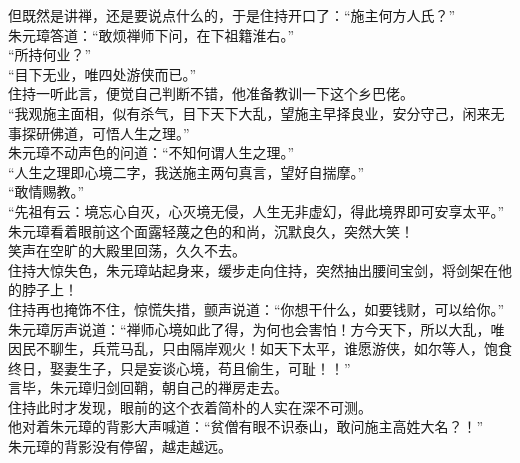 \begin{multicols}{\theparacolNo}
但既然是讲禅，还是要说点什么的，于是住持开口了：“施主何方人氏？”\\

朱元璋答道：“敢烦禅师下问，在下祖籍淮右。”\\

“所持何业？”\\

“目下无业，唯四处游侠而已。”\\

住持一听此言，便觉自己判断不错，他准备教训一下这个乡巴佬。\\

“我观施主面相，似有杀气，目下天下大乱，望施主早择良业，安分守己，闲来无事探研佛道，可悟人生之理。”\\

朱元璋不动声色的问道：“不知何谓人生之理。”\\

“人生之理即心境二字，我送施主两句真言，望好自揣摩。”\\

“敢情赐教。”\\

“先祖有云：境忘心自灭，心灭境无侵，人生无非虚幻，得此境界即可安享太平。”\\

朱元璋看着眼前这个面露轻蔑之色的和尚，沉默良久，突然大笑！\\

笑声在空旷的大殿里回荡，久久不去。\\

住持大惊失色，朱元璋站起身来，缓步走向住持，突然抽出腰间宝剑，将剑架在他的脖子上！\\

住持再也掩饰不住，惊慌失措，颤声说道：“你想干什么，如要钱财，可以给你。”\\

朱元璋厉声说道：“禅师心境如此了得，为何也会害怕！方今天下，所以大乱，唯因民不聊生，兵荒马乱，只由隔岸观火！如天下太平，谁愿游侠，如尔等人，饱食终日，娶妻生子，只是妄谈心境，苟且偷生，可耻！！”\\

言毕，朱元璋归剑回鞘，朝自己的禅房走去。\\

住持此时才发现，眼前的这个衣着简朴的人实在深不可测。\\

他对着朱元璋的背影大声喊道：“贫僧有眼不识泰山，敢问施主高姓大名？！”\\

朱元璋的背影没有停留，越走越远。\\


\end{multicols}
